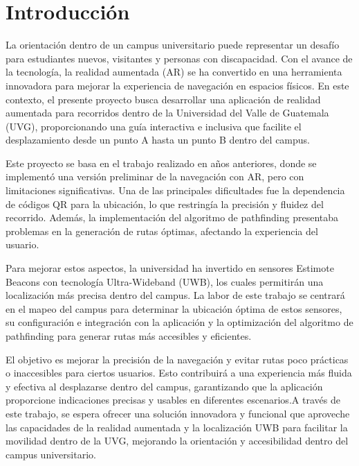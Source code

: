 \documentclass{article}
\begin{document}
\section{Introducción}
{\justify
La orientación dentro de un campus universitario puede representar un desafío para estudiantes nuevos, visitantes y personas con
 discapacidad. Con el avance de la tecnología, la realidad aumentada (AR) se ha convertido en una herramienta innovadora para mejorar
  la experiencia de navegación en espacios físicos. En este contexto, el presente proyecto busca desarrollar una aplicación de realidad
   aumentada para recorridos dentro de la Universidad del Valle de Guatemala (UVG), proporcionando una guía interactiva e inclusiva 
   que facilite el desplazamiento desde un punto A hasta un punto B dentro del campus.

Este proyecto se basa en el trabajo realizado en años anteriores, donde se implementó una versión preliminar de la navegación con AR,
 pero con limitaciones significativas. Una de las principales dificultades fue la dependencia de códigos QR para la ubicación, lo que
  restringía la precisión y fluidez del recorrido. Además, la implementación del algoritmo de pathfinding presentaba problemas en la 
  generación de rutas óptimas, afectando la experiencia del usuario.

Para mejorar estos aspectos, la universidad ha invertido en sensores Estimote Beacons con tecnología Ultra-Wideband (UWB), los cuales
 permitirán una localización más precisa dentro del campus. La labor de este trabajo se centrará en el mapeo del campus para 
 determinar la ubicación óptima de estos sensores, su configuración e integración con la aplicación y la optimización del algoritmo
  de pathfinding para generar rutas más accesibles y eficientes.

El objetivo es mejorar la precisión de la navegación y evitar rutas poco prácticas o inaccesibles para ciertos usuarios. Esto 
contribuirá a una experiencia más fluida y efectiva al desplazarse dentro del campus, garantizando que la aplicación proporcione 
indicaciones precisas y usables en diferentes escenarios.A través de este trabajo, se espera ofrecer una solución innovadora y 
funcional que aproveche las capacidades de la realidad aumentada y la localización UWB para facilitar la movilidad dentro de la UVG,
 mejorando la orientación y accesibilidad dentro del campus universitario.}

\newpage
\end{document}
